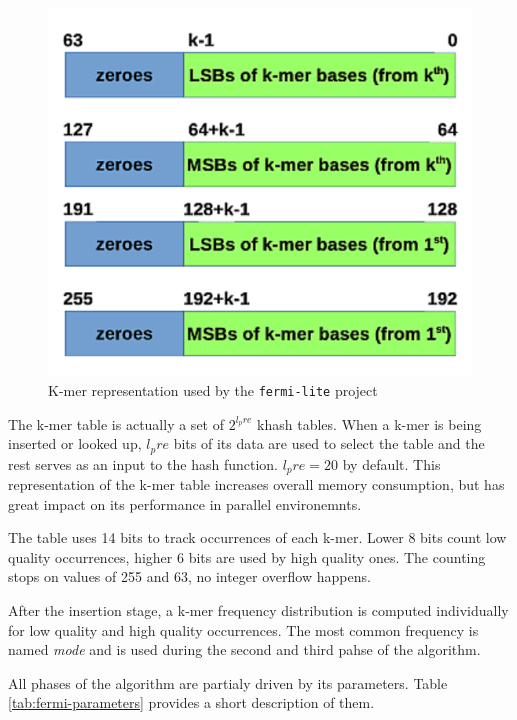 \begin{figure}[h]
	\centering
	\includegraphics{img/fermi-kmer-structure.pdf}
	\caption{K-mer representation used by the \texttt{fermi-lite} project}
	\label{fig:fermi-kmer-structure}
\end{figure}

The k-mer table is actually a set of $2^{l_pre}$ khash tables. When a k-mer is being inserted or looked up, $l_pre$ bits of its data are used to select the table and the rest serves as an input to the hash function. $l_pre = 20$ by default. This representation of the k-mer table increases overall memory consumption, but has great impact on its performance in parallel environemnts. 

The table uses 14 bits to track occurrences of each k-mer. Lower 8 bits count low quality occurrences, higher 6 bits are used by high quality ones. The counting stops on values of 255 and 63, no integer overflow happens.

After the insertion stage, a k-mer frequency distribution is computed individually for low quality and high quality occurrences. The most common frequency is named \textit{mode} and is used during the second and third pahse of the algorithm.

All phases of the algorithm are partialy driven by its parameters. Table \ref{tab:fermi-parameters} provides a short description of them.

